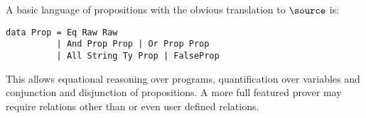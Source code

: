 A basic language of propositions with the obvious translation to
$\source$ is:

\begin{verbatim}
data Prop = Eq Raw Raw
          | And Prop Prop | Or Prop Prop
          | All String Ty Prop | FalseProp
\end{verbatim}

This allows equational reasoning over \Funl{} programs, quantification
over variables and conjunction and disjunction of propositions. A more
full featured prover may require relations other than  or
even user defined relations.
